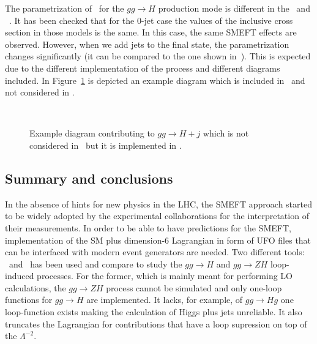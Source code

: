     
The parametrization of \cpG\ for the $gg\to H$ production mode is different in the \SMEFTsim\ and \SMEFTatNLO\ . It has been checked that for the 0-jet case the values of the inclusive cross section in those models is the same. In this case, the same SMEFT effects are observed. However, when we add jets to the final state, the parametrization changes significantly (it can be compared to the one shown in~\cite{ATL-PHYS-PUB-2019-042}). This is expected due to the different implementation of the process and different diagrams included. In Figure~\ref{fig:higgseft:diagram} is depicted an example diagram which is included in \SMEFTatNLO\ and not considered in \SMEFTsim.

\begin{figure}
  \centering
    \\
    \caption{ Example diagram contributing to $gg\to H +j$ which is not considered in \SMEFTsim\ but it is implemented in \SMEFTatNLO.}
    \label{fig:higgseft:diagram}
\end{figure}

\subsection{Summary and conclusions}
In the absence of hints for new physics in the LHC, the SMEFT approach started to be widely adopted by the experimental collaborations for the interpretation of their measurements. In order to be able to have predictions for the SMEFT, implementation of the SM plus dimension-6 Lagrangian in form of UFO files that can be interfaced with modern event generators are needed. Two different tools: \SMEFTsim\ and \SMEFTatNLO\ has been used and compare to study the $gg\to H$ and $gg\to ZH$ loop-induced processes. For the former, which is mainly meant for performing LO calculations, the $gg\to ZH$ process cannot be simulated and only one-loop functions for $gg\to H$ are implemented. It lacks, for example, of $gg\to Hg$ one loop-function exists making the calculation of Higgs plus jets unreliable. It also truncates the Lagrangian for contributions that have a loop supression on top of the $\Lambda^{-2}$.

